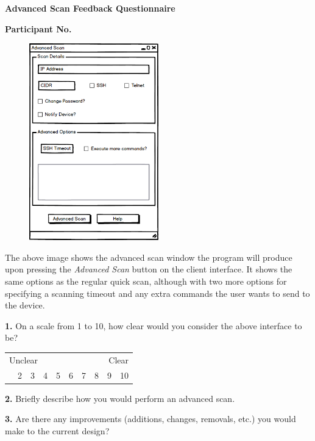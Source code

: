 \begin{center}
	\textbf{Advanced Scan Feedback Questionnaire}\par
	\textbf{Participant No.}\par
\end{center}

\vspace{0.5cm}

\begin{figure}[h]
\begin{center}
	\includegraphics[width=0.5\textwidth]{img/advanced_scan_mockup.png}
\end{center}
\end{figure}

\vspace{0.5cm}

The above image shows the advanced scan window the program will produce upon pressing the \textit{Advanced Scan} button on
the client interface. It shows the same options as the regular quick scan, although with two more options for specifying a
scanning timeout and any extra commands the user wants to send to the device.

\vspace{0.5cm}

\textbf{1.} On a scale from 1 to 10, how clear would you consider the above interface to be?

\begin{center}
	\begin{table}[h]
	\label{my-label}
	\begin{tabularx}{\textwidth}{XXXXXXXXXX}
	\multicolumn{5}{l}{Unclear} & \multicolumn{5}{r}{Clear} \\
	\centering
	1    & 2    & 3    & 4    & 5    & 6   & 7   & 8   & 9  & 10
	\end{tabularx}
	\end{table}
\end{center}

\textbf{2.} Briefly describe how you would perform an advanced scan.

\vspace{5cm}

\textbf{3.} Are there any improvements (additions, changes, removals, etc.) you would make to the current design?

\vspace{5cm}

